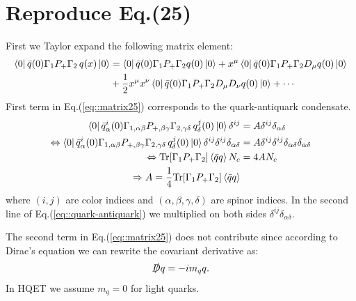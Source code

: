 \documentclass[openright,twoside,12pt,a4paper,final]{article}
\begin{document}
\section{Reproduce Eq.(25)}
	First we Taylor expand the following matrix element:
	\begin{align}
	    \bra{0} \bar{q}(0) \Gamma_{1} P_{+} \Gamma_{2} \,q(x) \ket{0} &= \bra{0} \bar{q}(0) \Gamma_{1} P_{+} \Gamma_{2} q(0) \ket{0} + x^{\mu} \bra{0} \bar{q}(0) \Gamma_{1} P_{+} \Gamma_{2} D_{\mu} q(0) \ket{0} \nonumber \\
	    & +\frac{1}{2} x^{\mu} x^{\nu} \bra{0} \bar{q}(0) \Gamma_{1} P_{+} \Gamma_{2} D_{\mu} D_{\nu} q(0) \ket{0} + \cdots
	    \label{eq::matrix25}
	\end{align}
    First term in Eq.(\ref{eq::matrix25}) corresponds to the quark-antiquark condensate. 
    \begin{align}
         \bra{0} \bar{q}^{i}_{\alpha}(0) \Gamma_{1,\alpha \beta} P_{+, \beta\gamma} \Gamma_{2, \gamma \delta} \,q^{j}_{\delta}(0) \ket{0} \delta^{ij} &= A \delta^{ij} \delta_{\alpha \delta} \nonumber \\
         \Leftrightarrow \bra{0} \bar{q}^{i}_{\alpha}(0) \Gamma_{1,\alpha \beta} P_{+, \beta\gamma} \Gamma_{2, \gamma \delta} \,q^{j}_{\delta}(0) \ket{0} \delta^{ij} \delta^{ij}\delta_{\alpha \delta} &= A \delta^{ij} \delta^{ij} \delta_{\alpha \delta} \delta_{\alpha \delta}\nonumber \\
          \Leftrightarrow \text{Tr}[\Gamma_{1} P_{+} \Gamma_{2}] \braket{\bar{q} q} N_{c}  &= 4 A N_{c} \nonumber \\
          \Rightarrow A = \frac{1}{4} \text{Tr}[\Gamma_{1} P_{+} \Gamma_{2}] \braket{\bar{q} q}
         \label{eq::quark-antiquark}
    \end{align}
    where $(i,j)$ are color indices and $(\alpha, \beta,\gamma,\delta)$ are spinor indices. In the second line of Eq.(\ref{eq::quark-antiquark}) we multiplied on both sides $\delta^{ij} \delta_{\alpha \delta}$.
    
    The second term in Eq.(\ref{eq::matrix25}) does not contribute since according to Dirac's equation we can rewrite the covariant derivative as:
    \begin{align}
        \slashed{D} q = - i m_{q} q.
    \end{align}
    In HQET we assume $m_{q} = 0$ for light quarks.
    
\end{document}
